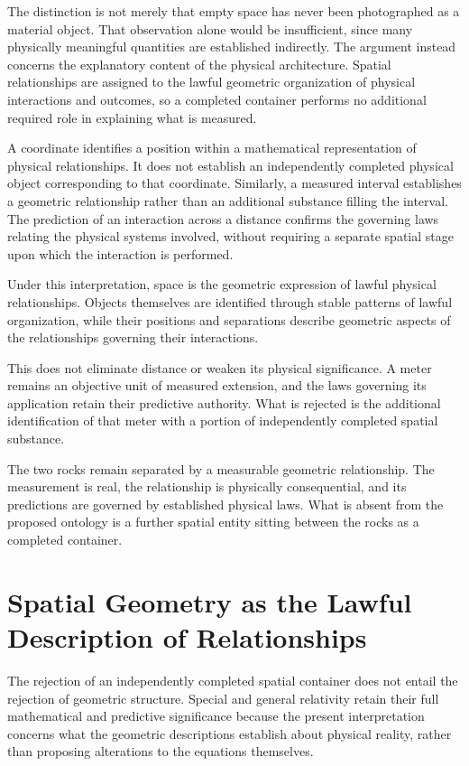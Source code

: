 \documentclass[12pt,onecolumn]{article}
\begin{document}
The distinction is not merely that empty space has never been photographed as a material object. That observation alone would be insufficient, since many physically meaningful quantities are established indirectly. The argument instead concerns the explanatory content of the physical architecture. Spatial relationships are assigned to the lawful geometric organization of physical interactions and outcomes, so a completed container performs no additional required role in explaining what is measured.

A coordinate identifies a position within a mathematical representation of physical relationships. It does not establish an independently completed physical object corresponding to that coordinate. Similarly, a measured interval establishes a geometric relationship rather than an additional substance filling the interval. The prediction of an interaction across a distance confirms the governing laws relating the physical systems involved, without requiring a separate spatial stage upon which the interaction is performed.

Under this interpretation, space is the geometric expression of lawful physical relationships. Objects themselves are identified through stable patterns of lawful organization, while their positions and separations describe geometric aspects of the relationships governing their interactions.

This does not eliminate distance or weaken its physical significance. A meter remains an objective unit of measured extension, and the laws governing its application retain their predictive authority. What is rejected is the additional identification of that meter with a portion of independently completed spatial substance.

The two rocks remain separated by a measurable geometric relationship. The measurement is real, the relationship is physically consequential, and its predictions are governed by established physical laws. What is absent from the proposed ontology is a further spatial entity sitting between the rocks as a completed container.

\section{Spatial Geometry as the Lawful Description of Relationships}

The rejection of an independently completed spatial container does not entail the rejection of geometric structure. Special and general relativity retain their full mathematical and predictive significance because the present interpretation concerns what the geometric descriptions establish about physical reality, rather than proposing alterations to the equations themselves.
\end{document}
